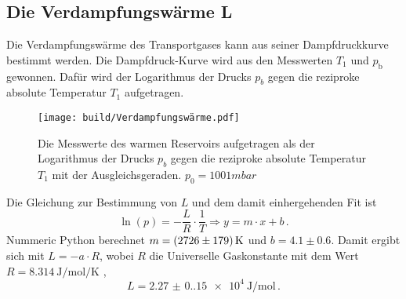     \subsection{Die Verdampfungswärme L}
    Die Verdampfungswärme des Transportgases kann aus seiner Dampfdruckkurve bestimmt werden.
    Die Dampfdruck-Kurve wird aus den Messwerten $T_1$ und $p_\text{b}$ gewonnen.
    Dafür wird der Logarithmus der Drucks $p_b$ gegen die reziproke absolute Temperatur $T_1$ aufgetragen.
    \begin{figure}[H]
        \centering
        \texttt{[image: build/Verdampfungswärme.pdf]}
        \caption{Die Messwerte des warmen Reservoirs aufgetragen als
        der Logarithmus der Drucks $p_b$ gegen die reziproke absolute Temperatur
        $T_1$ mit der Ausgleichsgeraden. $p_0 = 1001mbar$}
    \end{figure}
    Die Gleichung zur Bestimmung von $L$ und dem damit einhergehenden Fit ist
    \begin{equation}
        \ln(p) = - \frac{L}{R} \cdot \frac{1}{T}
        \Rightarrow y = m \cdot x + b \, \text{.}
    \end{equation}
    Nummeric Python berechnet $m = \SI{2726 \pm 179}{\kelvin}$ und $b = 4.1 \pm 0.6$.
    Damit ergibt sich mit $L = -a \cdot R$, wobei $R$ die Universelle Gaskonstante mit dem Wert
    $R = \SI{8.314}{\joule\per\mole\per\kelvin}$ \cite{Gaskonstante},
    \begin{equation*}
        L = \SI{2.27(0.15)e+4}{\joule\per\mol} \, \text{.}
    \end{equation*}
